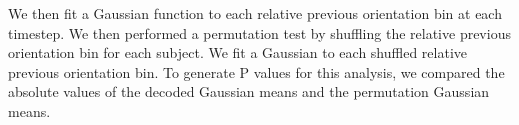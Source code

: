\documentclass[../main.tex]{subfiles}
\begin{document}
We then fit a Gaussian function to each relative previous orientation bin at each timestep. We then performed a permutation test by shuffling the relative previous orientation bin for each subject. We fit a Gaussian to each shuffled relative previous orientation bin. To generate P values for this analysis, we compared the absolute values of the decoded Gaussian means and the permutation Gaussian means.
\end{document}
